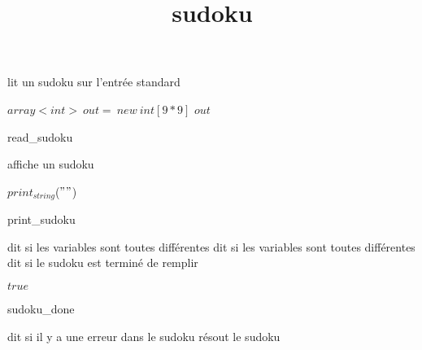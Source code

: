 \documentclass[8pt]{article}
\title{sudoku}
\begin{document}
\maketitle
 lit un sudoku sur l'entr\'ee standard 
\begin{algorithm}[H]
\Input{}

$array<int>\:out=\:new\:int[9 * 9]$\;
\Return $ out $\;
\caption{read\_sudoku}
\end{algorithm}
 affiche un sudoku 
\begin{algorithm}[H]


$print_{string}$($ "
" $)\;
\caption{print\_sudoku}
\end{algorithm}
 dit si les variables sont toutes diff\'erentes 
 dit si les variables sont toutes diff\'erentes 
 dit si le sudoku est termin\'e de remplir 
\begin{algorithm}[H]


\Return $ true $\;
\caption{sudoku\_done}
\end{algorithm}
 dit si il y a une erreur dans le sudoku 
 r\'esout le sudoku
\end{document}
